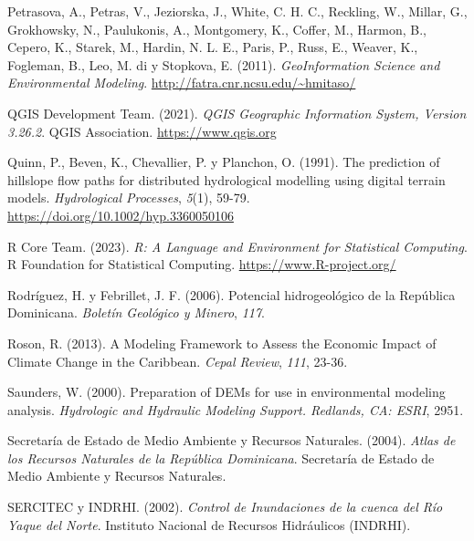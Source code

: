 \documentclass[spanish]{article}
\newlength{\cslhangindent}
\newlength{\cslentryspacingunit} %
\newenvironment{CSLReferences}[2] %
 {%
  \setlength{\parindent}{0pt}
  \ifodd #1
  \let\oldpar\par
  \def\par{\hangindent=\cslhangindent\oldpar}
  \fi
  \setlength{\parskip}{#2\cslentryspacingunit}
 }%
 {}
\begin{document}
\begin{CSLReferences}{1}{0}
\leavevmode{}%
Petrasova, A., Petras, V., Jeziorska, J., White, C. H. C., Reckling, W.,
Millar, G., Grokhowsky, N., Paulukonis, A., Montgomery, K., Coffer, M.,
Harmon, B., Cepero, K., Starek, M., Hardin, N. L. E., Paris, P., Russ,
E., Weaver, K., Fogleman, B., Leo, M. di y Stopkova, E. (2011).
\emph{GeoInformation Science and Environmental Modeling}.
\url{http://fatra.cnr.ncsu.edu/~hmitaso/}

\leavevmode{}%
QGIS Development Team. (2021). \emph{QGIS Geographic Information System,
Version 3.26.2}. QGIS Association. \url{https://www.qgis.org}

\leavevmode{}%
Quinn, P., Beven, K., Chevallier, P. y Planchon, O. (1991). The
prediction of hillslope flow paths for distributed hydrological
modelling using digital terrain models. \emph{Hydrological Processes},
\emph{5}(1), 59-79. \url{https://doi.org/10.1002/hyp.3360050106}

\leavevmode{}%
R Core Team. (2023). \emph{R: A Language and Environment for Statistical
Computing}. R Foundation for Statistical Computing.
\url{https://www.R-project.org/}

\leavevmode{}%
Rodríguez, H. y Febrillet, J. F. (2006). {Potencial hidrogeológico de la
República Dominicana}. \emph{Boletín Geológico y Minero}, \emph{117}.

\leavevmode{}%
Roson, R. (2013). A Modeling Framework to Assess the Economic Impact of
Climate Change in the Caribbean. \emph{Cepal Review}, \emph{111}, 23-36.

\leavevmode{}%
Saunders, W. (2000). Preparation of DEMs for use in environmental
modeling analysis. \emph{Hydrologic and Hydraulic Modeling Support.
Redlands, CA: ESRI}, 2951.

\leavevmode{}%
Secretaría de Estado de Medio Ambiente y Recursos Naturales. (2004).
\emph{{Atlas de los Recursos Naturales de la República Dominicana}}.
{Secretaría de Estado de Medio Ambiente y Recursos Naturales}.

\leavevmode{}%
SERCITEC y INDRHI. (2002). \emph{{Control de Inundaciones de la cuenca
del Río Yaque del Norte}}. {Instituto Nacional de Recursos Hidráulicos
(INDRHI)}.


\end{CSLReferences}
\end{document}
